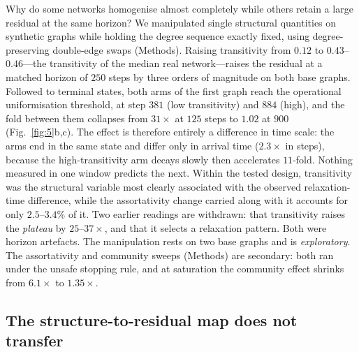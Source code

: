 \documentclass[11pt]{article}
\begin{document}
Why do some networks homogenise almost completely while others retain a large
residual at the same horizon? We manipulated single structural quantities on
synthetic graphs while holding the degree sequence exactly fixed, using
degree-preserving double-edge swaps \cite{MaslovSneppen2002} (Methods).
Raising transitivity from $0.12$ to $0.43$--$0.46$---the transitivity of the
median real network---raises the residual at a matched horizon of $250$ steps
by three orders of magnitude on both base graphs. Followed to terminal states,
both arms of the first graph reach the operational uniformisation threshold, at
step $381$ (low transitivity) and $884$ (high), and the fold between them
collapses from $31\times$ at $125$ steps to $1.02$ at $900$
(Fig.~\ref{fig:5}b,c). The effect is therefore entirely a difference in time
scale: the arms end in the same state and differ only in arrival time
($2.3\times$ in steps), because the high-transitivity arm decays slowly then
accelerates $11$-fold. Nothing measured in one window predicts the next. Within
the tested design, transitivity was the structural variable most clearly
associated with the observed relaxation-time difference, while the assortativity
change carried along with it accounts for only $2.5$--$3.4\%$ of it.
Two earlier readings are withdrawn: that transitivity raises the
\emph{plateau} by $25$--$37\times$, and that it selects a relaxation pattern.
Both were horizon artefacts. The manipulation rests on two base graphs and is
\emph{exploratory}. The assortativity and community sweeps (Methods) are
secondary: both ran under the unsafe stopping rule, and at saturation the
community effect shrinks from $6.1\times$ to $1.35\times$.

\subsection*{The structure-to-residual map does not transfer}
\end{document}
